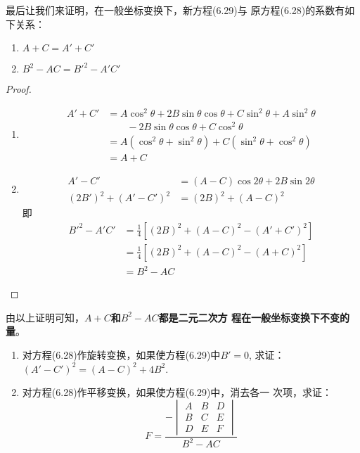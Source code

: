最后让我们来证明，在一般坐标变换下，新方程(6.29)与
原方程(6.28)的系数有如下关系：
\begin{enumerate}
    \item $A+C=A'+C'$
    \item $B^2-AC={B'}^2-A'C'$
\end{enumerate}

\begin{proof}
\begin{enumerate}
    \item \[\begin{split}
 A'+C'&=A\cos^2\theta +2B\sin\theta \cos\theta 
    +C \sin^2\theta +A\sin^2\theta
    \\
    &\qquad -2B\sin\theta \cos\theta +C\cos^2\theta\\
    &=A(\cos^2\theta+\sin^2\theta)+C(\sin^2\theta+\cos^2\theta)\\
    &=A+C       
    \end{split}\]
    \item \[\begin{split}
A'-C'&=(A-C)\cos2\theta+2B\sin2\theta \\
(2B')^2+(A'-C')^2&=(2B)^2+(A-C)^2        
    \end{split}\]
    即
\[\begin{split}
    {B'}^2-A'C'&=\frac{1}{4}\left[(2B)^2+(A-C)^2-(A'+C')^2\right]\\
    &=\frac{1}{4}\left[(2B)^2+(A-C)^2-(A+C)^2\right]\\
    &=B^2-AC
\end{split}\]
\end{enumerate}
\end{proof}

由以上证明可知，\textbf{$A+C$和$B^2-AC$都是二元二次方
程在一般坐标变换下不变的量}。

\begin{ex}
\begin{enumerate}
    \item 对方程(6.28)作旋转变换，如果使方程(6.29)中$B'=0$, 
    求证：$(A'-C')^2=(A-C)^2+4B^2$.
    \item 对方程(6.28)作平移变换，如果使方程(6.29)中，消去各一
    次项，求证：
\[F=\frac{-\begin{vmatrix}
    A&B&D\\B&C&E\\D&E&F
\end{vmatrix}}{B^2-AC}\]
\end{enumerate}
\end{ex}

